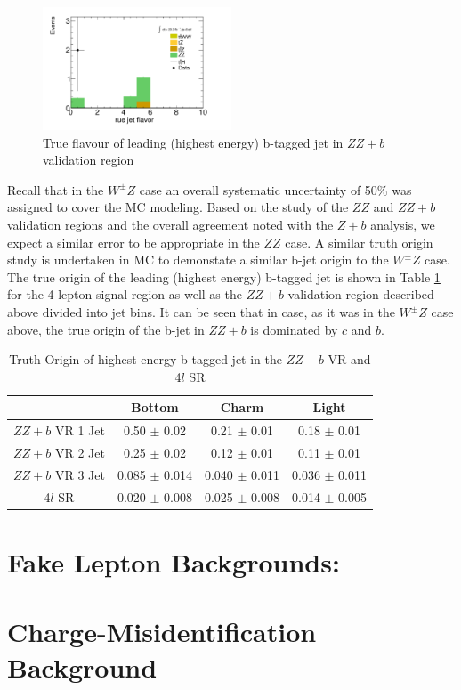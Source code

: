 \begin{figure}[!htbp]
\centering \includegraphics[width=0.5\textwidth]{figs/WZ/zz_b_trueflavour}
\caption{True flavour of leading (highest energy) b-tagged jet in $ZZ+b$ validation region} 
\label{fig:zz_b_truth}
\end{figure} 
  
Recall that in the $W^{\pm}Z$ case an overall systematic uncertainty of 50\% was assigned to cover the MC modeling. Based on the study of the $ZZ$ and 
$ZZ+b$ validation regions and the overall agreement noted with the $Z+b$ analysis, we expect a similar error to be appropriate in the $ZZ$ case.  
A similar truth origin study is undertaken in MC to demonstate a similar b-jet origin to the $W^{\pm}Z$ case. The true origin of the leading (highest energy) b-tagged jet is shown in 
Table \ref{table:zz_truth} for the 4-lepton signal region as well as the $ZZ+b$ validation region described above divided into jet bins. It can be seen 
that in case, as it was in the $W^{\pm}Z$ case above, the true origin of the b-jet in $ZZ+b$ is dominated by $c$ and $b$.

\begin{table}[htbp]
\centering 
\begin{tabular}{|c|c|c|c|} 
  \hline
                 & Bottom      & Charm       & Light \\
  \hline
  $ZZ+b$ VR 1 Jet& 0.50  $\pm$ 0.02  & 0.21  $\pm$ 0.01  & 0.18  $\pm$ 0.01 \\ 
  $ZZ+b$ VR 2 Jet& 0.25  $\pm$ 0.02  & 0.12  $\pm$ 0.01  & 0.11  $\pm$ 0.01 \\ 
  $ZZ+b$ VR 3 Jet& 0.085 $\pm$ 0.014 & 0.040 $\pm$ 0.011 & 0.036 $\pm$ 0.011 \\
  4$l$ SR        & 0.020 $\pm$ 0.008 & 0.025 $\pm$ 0.008 & 0.014 $\pm$ 0.005 \\
  \hline 
\end{tabular}
\caption{Truth Origin of highest energy b-tagged jet in the $ZZ+b$ VR and 4$l$ SR} 
\label{table:zz_truth}
\end{table} 



\section{Fake Lepton Backgrounds: \ttbar}


\section{Charge-Misidentification Background }
